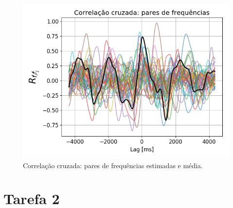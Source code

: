 \documentclass[12pt,letterpaper]{article}
\begin{document}
\begin{enumerate}[label=(\alph*)]
        \begin{figure}[H]
            \centering
            \includegraphics[width=15cm]{TC2/images/corr-freq-freq.png}
            \caption{Correlação cruzada: pares de frequências estimadas e média.}
            \label{fig:cxfreqfreq}
        \end{figure}
    
    
\end{enumerate}

\section*{Tarefa 2}
\end{document}
